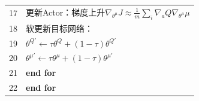 \begin{table}[t]
\begin{tabular}{lp{}}
17 & \qquad 更新Actor：梯度上升$\nabla_{\theta^\mu}J \approx \frac{1}{m}\sum_i\nabla_a Q\nabla_{\theta^\mu}\mu$ \\
  
18 & \qquad 软更新目标网络： \\
19 & \qquad $\theta^{Q'} \leftarrow \tau\theta^Q + (1-\tau)\theta^{Q'}$ \\
20 & \qquad $\theta^{\mu'} \leftarrow \tau\theta^\mu + (1-\tau)\theta^{\mu'}$ \\
  
21 & \quad \textbf{end for} \\
  
22 & \textbf{end for} \\
\bottomrule
\end{tabular}
\end{table}

